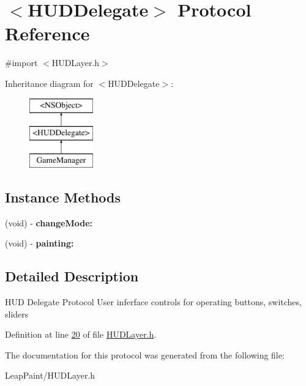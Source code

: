 \hypertarget{protocol_h_u_d_delegate-p}{\section{$<$H\-U\-D\-Delegate$>$ Protocol Reference}
\label{d4/db1/protocol_h_u_d_delegate-p}
}


{\ttfamily \#import $<$H\-U\-D\-Layer.\-h$>$}

Inheritance diagram for $<$H\-U\-D\-Delegate$>$\-:\begin{figure}[H]
\begin{center}
\leavevmode
\includegraphics[height=3.000000cm]{d4/db1/protocol_h_u_d_delegate-p}
\end{center}
\end{figure}
\subsection*{Instance Methods}
\begin{DoxyCompactItemize}
\item 
\hypertarget{protocol_h_u_d_delegate-p_a9eb11385bd55a3f61fcd752d154bcc81}{(void) -\/ {\bfseries change\-Mode\-:}}\label{d4/db1/protocol_h_u_d_delegate-p_a9eb11385bd55a3f61fcd752d154bcc81}

\item 
\hypertarget{protocol_h_u_d_delegate-p_a2bef4ad83cca602f9c241bbb90f86ab7}{(void) -\/ {\bfseries painting\-:}}\label{d4/db1/protocol_h_u_d_delegate-p_a2bef4ad83cca602f9c241bbb90f86ab7}

\end{DoxyCompactItemize}


\subsection{Detailed Description}
H\-U\-D Delegate Protocol User inferface controls for operating buttons, switches, sliders 

Definition at line \hyperlink{_h_u_d_layer_8h_source_l00020}{20} of file \hyperlink{_h_u_d_layer_8h_source}{H\-U\-D\-Layer.\-h}.



The documentation for this protocol was generated from the following file\-:\begin{DoxyCompactItemize}
\item 
Leap\-Paint/H\-U\-D\-Layer.\-h\end{DoxyCompactItemize}
